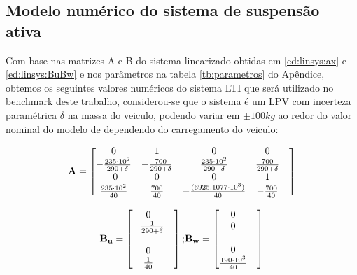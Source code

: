 \subsection{Modelo numérico do sistema de suspensão ativa}
Com base nas matrizes A e B do sistema linearizado obtidas em \ref{ed:linsys:ax} e \ref{ed:linsys:BuBw} e nos parâmetros na tabela \ref{tb:parametros} do Apêndice, obtemos os seguintes valores numéricos do sistema LTI que será utilizado no benchmark deste trabalho, considerou-se que o sistema é um LPV com incerteza paramétrica $\delta$ na massa do veiculo, podendo variar em $\pm 100 kg$ ao redor do valor nominal do modelo de dependendo do carregamento do veiculo:

\begin{equation}\label{ed:linsys:ALPV}
    \begin{split}
        \mathbf{A} =
        \begin{bmatrix}
            0 & 1 & 0 & 0 & \\            
            -\frac{235\cdot10^2}{290+\delta}&-\frac{700}{290+\delta}&\frac{235\cdot10^2}{290+\delta}&\frac{700}{290+\delta} &\\ \  
            0 & 0 & 0 & 1 & \\
            \frac{235\cdot10^2}{40}&\frac{700}{40}&-\frac{(6925.1077\cdot10^{3})}{40}&-\frac{700}{40} &\\
        \end{bmatrix}
    \end{split}
\end{equation}

\begin{equation}\label{ed:linsys:BLPV}
    \begin{split}
        \mathbf{B_u} = 
        \begin{bmatrix}
            0 & \\            
            -\frac{1}{290+\delta}&\\ \\  
            0 & \\
            \frac{1}{40}&\\
        \end{bmatrix};
    \end{split}
    \begin{split}
        \mathbf{B_w} = 
        \begin{bmatrix}
            0 & \\            
            0 &\\ \\  
            0 & \\
            \frac{190\cdot10^3}{40}& \\
        \end{bmatrix}
    \end{split}
\end{equation}

